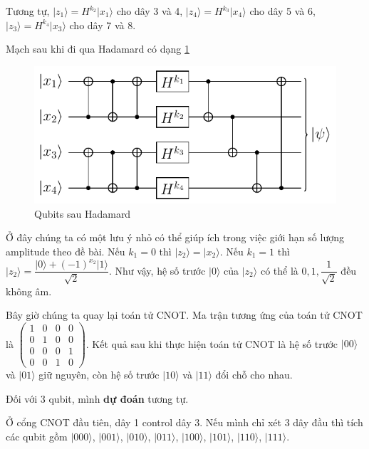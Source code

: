 Tương tự, $\lvert z_1 \rangle = H^{k_2} \lvert x_1 \rangle$ cho dây 3 và 4, $\lvert z_4 \rangle = H^{k_3} \lvert x_4 \rangle$ cho dây 5 và 6, $\lvert z_3 \rangle = H^{k_4} \lvert x_3 \rangle$ cho dây 7 và 8.

Mạch sau khi đi qua Hadamard có dạng \ref{nsucrypto23:p10_5}

\begin{figure}[ht]
    \centering
    \includegraphics[page=7]{nsucrypto/2023/problem10_figures.pdf}
    \caption{Qubits sau Hadamard}
    \label{nsucrypto23:p10_5}
\end{figure}

Ở đây chúng ta có một lưu ý nhỏ có thể giúp ích trong việc giới hạn số lượng amplitude theo đề bài. Nếu $k_1 = 0$ thì $\lvert z_2 \rangle = \lvert x_2 \rangle$. Nếu $k_1 = 1$ thì $\lvert z_2 \rangle = \dfrac{\lvert 0 \rangle + (-1)^{x_2} \lvert 1 \rangle}{\sqrt{2}}$. Như vậy, hệ số trước $\lvert 0 \rangle$ của $\lvert z_2 \rangle$ có thể là $0, 1, \dfrac{1}{\sqrt{2}}$ đều không âm.

Bây giờ chúng ta quay lại toán tử CNOT. Ma trận tương ứng của toán tử CNOT là $\begin{pmatrix} 1 & 0 & 0 & 0 \\ 0 & 1 & 0 & 0 \\ 0 & 0 & 0 & 1 \\ 0 & 0 & 1 & 0 \end{pmatrix}$. Kết quả sau khi thực hiện toán tử CNOT là hệ số trước $\lvert 00 \rangle$ và $\lvert 01 \rangle$ giữ nguyên, còn hệ số trước $\lvert 10 \rangle$ và $\lvert 11 \rangle$ đổi chỗ cho nhau.

Đối với 3 qubit, mình \textbf{dự đoán} tương tự. 

Ở cổng CNOT đầu tiên, dây 1 control dây 3. Nếu mình chỉ xét 3 dây đầu thì tích các qubit gồm $\lvert 000 \rangle$, $\lvert 001 \rangle$, $\lvert 010 \rangle$, $\lvert 011 \rangle$, $\lvert 100 \rangle$, $\lvert 101 \rangle$, $\lvert 110 \rangle$, $\lvert 111 \rangle$. 

